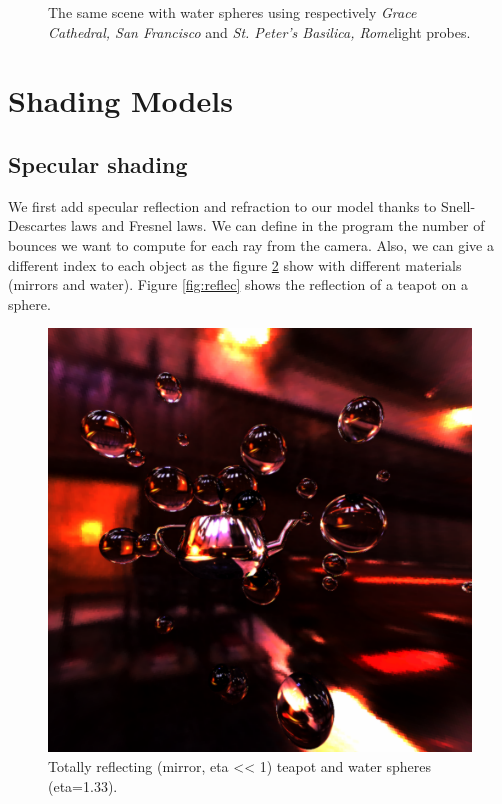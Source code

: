 \documentclass[acmsmall]{acmart}
\begin{document}
\begin{figure}[h]
    \caption{The same scene with water spheres using respectively \textit{Grace Cathedral, San Francisco} and \textit{St. Peter's Basilica, Rome}light probes. }
    \label{fig:hdrprobes}
\end{figure}


\section{Shading Models}

\subsection{Specular shading}
We first add specular reflection and refraction to our model thanks to Snell-Descartes laws and Fresnel laws.
We can define in the program the number of bounces we want to compute for each ray from the camera.
Also, we can give a different index to each object as the figure \ref{fig:reflecrefrac} show with different materials (mirrors and water).
Figure \ref{fig:reflec} shows the reflection of a teapot on a sphere.
\begin{figure}[h]
    \centering
    

  \includegraphics[width=.6\linewidth]{img/refracreflec.png}

    
    \caption{Totally reflecting (mirror, eta << 1) teapot and water spheres (eta=1.33).}
    \label{fig:reflecrefrac}
\end{figure}
\end{document}
